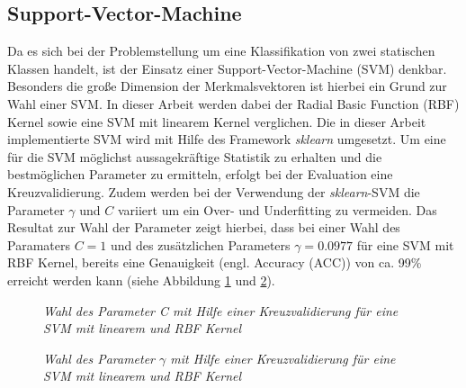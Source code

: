 \documentclass[conference]{IEEEtran}
\begin{document}

%

\subsection{Support-Vector-Machine}
Da es sich bei der Problemstellung um eine Klassifikation von zwei statischen Klassen handelt, ist der Einsatz einer Support-Vector-Machine (SVM) denkbar. Besonders die große Dimension der Merkmalsvektoren ist hierbei ein Grund zur Wahl einer SVM. In dieser Arbeit werden dabei der \glqq Radial Basic Function\grqq{} (RBF) Kernel sowie eine SVM mit linearem Kernel verglichen.
Die in dieser Arbeit implementierte SVM wird mit Hilfe des Framework \textit{sklearn} umgesetzt. Um eine für die SVM möglichst aussagekräftige Statistik zu erhalten und die bestmöglichen Parameter zu ermitteln, erfolgt bei der Evaluation eine  Kreuzvalidierung. Zudem werden bei der Verwendung der \textit{sklearn}-SVM die Parameter $\gamma$ und $C$ variiert um ein Over- und Underfitting zu vermeiden.
Das Resultat zur Wahl der Parameter zeigt hierbei, dass bei einer Wahl des Paramaters $C=1$ und des zusätzlichen Parameters $\gamma = 0.0977$ für eine SVM mit RBF Kernel, bereits eine Genauigkeit (engl. \glqq Accuracy\grqq{} (ACC)) von ca. 99\% erreicht werden kann (siehe Abbildung \ref{fig:c_chooseSVM} und \ref{fig:gamma_chooseSVM}).

\begin{figure}[h!]
\centering

\label{fig:c_chooseSVM}
\caption{\em Wahl des Parameter C mit Hilfe einer Kreuzvalidierung für eine SVM mit linearem und RBF Kernel}
\end{figure}

\begin{figure}[h!]
\centering

\label{fig:gamma_chooseSVM}
\caption{\em Wahl des Parameter $\gamma$ mit Hilfe einer Kreuzvalidierung für eine SVM mit linearem und RBF Kernel}
\end{figure}
\end{document}
